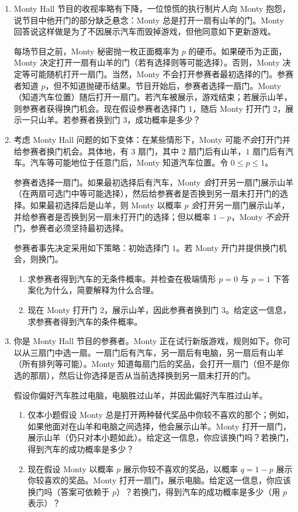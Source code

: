 \documentclass[UTF8,12pt,a4paper,fontset=fandol]{ctexart}
\begin{document}
\begin{enumerate}
  \item Monty Hall 节目的收视率略有下降，一位惊慌的执行制片人向 Monty 抱怨，说节目中他开门的部分缺乏悬念：Monty 总是打开一扇有山羊的门。Monty 回答说这样做是为了不因展示汽车而毁掉游戏，但他同意如下更新游戏。

  每场节目之前，Monty 秘密抛一枚正面概率为 $p$ 的硬币。如果硬币为正面，Monty 决定打开一扇有山羊的门（若有选择则等可能选择）。否则，Monty 决定等可能随机打开一扇门。当然，Monty 不会打开参赛者最初选择的门。参赛者知道 $p$，但不知道抛硬币结果。节目开始后，参赛者选择一扇门。Monty（知道汽车位置）随后打开一扇门。若汽车被展示，游戏结束；若展示山羊，则参赛者获得换门机会。现在假设参赛者选择门 $1$，随后 Monty 打开门 $2$，展示一只山羊。若参赛者换到门 $3$，成功概率是多少？

  \item 考虑 Monty Hall 问题的如下变体：在某些情形下，Monty 可能\textit{不会}打开门并给参赛者换门机会。具体地，有 $3$ 扇门，其中 $2$ 扇门后有山羊，$1$ 扇门后有汽车。汽车等可能地位于任意门后，Monty 知道汽车位置。令 $0\le p\le 1$。

  参赛者选择一扇门。如果最初选择后有汽车，Monty \textit{会}打开另一扇门展示山羊（在两扇可选门中等可能选择），然后给参赛者是否换到另一扇未打开门的选择。如果最初选择后是山羊，则 Monty 以概率 $p$ \textit{会}打开另一扇门展示山羊，并给参赛者是否换到另一扇未打开门的选择；但以概率 $1-p$，Monty \textit{不会}开门，参赛者必须坚持最初选择。

  参赛者事先决定采用如下策略：初始选择门 $1$。若 Monty 开门并提供换门机会，则换门。
  \begin{enumerate}
    \item 求参赛者得到汽车的无条件概率。并检查在极端情形 $p=0$ 与 $p=1$ 下答案化为什么，简要解释为什么合理。
    \item 现在 Monty 打开门 $2$，展示山羊，因此参赛者换到门 $3$。给定这一信息，求参赛者得到汽车的条件概率。
  \end{enumerate}

  \item 你是 Monty Hall 节目的参赛者。Monty 正在试行新版游戏，规则如下。你可以从三扇门中选一扇。一扇门后有汽车，另一扇后有电脑，另一扇后有山羊（所有排列等可能）。Monty 知道每扇门后的奖品，会打开一扇门（但不是你选的那扇），然后让你选择是否从当前选择换到另一扇未打开的门。

  假设你偏好汽车胜过电脑，电脑胜过山羊，并因此偏好汽车胜过山羊。
  \begin{enumerate}
    \item 仅本小题假设 Monty 总是打开两种替代奖品中你较不喜欢的那个；例如，如果他面对在山羊和电脑之间选择，他会展示山羊。Monty 打开一扇门，展示山羊（仍只对本小题如此）。给定这一信息，你应该换门吗？若换门，得到汽车的成功概率是多少？
    \item 现在假设 Monty 以概率 $p$ 展示你较不喜欢的奖品，以概率 $q=1-p$ 展示你较喜欢的奖品。Monty 打开一扇门，展示电脑。给定这一信息，你应该换门吗（答案可依赖于 $p$）？若换门，得到汽车的成功概率是多少（用 $p$ 表示）？
  \end{enumerate}


\end{enumerate}
\end{document}
